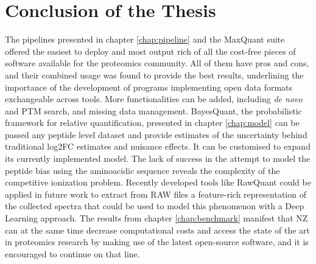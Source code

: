 \chapter{Conclusion of the Thesis}
\label{chap:conclusion}

The pipelines presented in chapter \ref{chap:pipeline} and the MaxQuant suite offered the easiest to deploy and most output rich of all the cost-free pieces of software available for the proteomics community. All of them have pros and cons, and their combined usage was found to provide the best results, underlining the importance of the development of programs implementing open data formats exchangeable across tools. More functionalities can be added, including \textit{de novo} and \ac{PTM} search, and missing data management. BayesQuant, the probabilistic framework for relative quantification, presented in chapter \ref{chap:model} can be passed any peptide level dataset and provide estimates of the uncertainty behind traditional \ac{log2FC} estimates and nuisance effects. It can be customised to expand its currently implemented model. The lack of success in the attempt to model the peptide bias using the aminoacidic sequence reveals the complexity of the competitive ionization problem. Recently developed tools like RawQuant could be applied in future work to extract from RAW files a feature-rich representation of the collected spectra that could be used to model this phenomenon with a Deep Learning approach. The results from chapter \ref{chap:benchmark} manifest that \ac{NZ} can at the same time decrease computational costs and access the state of the art in proteomics research by making use of the latest open-source software, and it is encouraged to continue on that line.